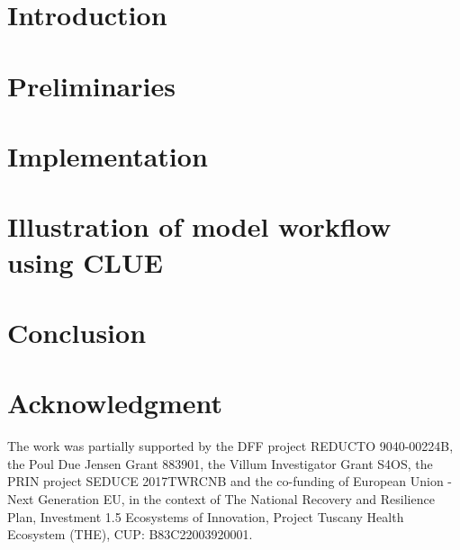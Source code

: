 \documentclass[a4paper,american]{llncs}
\begin{document}
\maketitle

\begin{abstract}
	
\end{abstract}



\section{Introduction}\label{sec_intro}




\section{Preliminaries}\label{sec_pre}




\section{Implementation}\label{sec_imp}





\section{Illustration of model workflow using CLUE}\label{sec_eval}





\section{Conclusion}\label{sec_conc}




\section*{Acknowledgment}
The work was partially supported by the DFF project REDUCTO 9040-00224B, the Poul Due Jensen Grant 883901, the Villum Investigator Grant S4OS, the PRIN project SEDUCE 2017TWRCNB and the co-funding of European Union - Next Generation EU, in the context of The National Recovery and Resilience Plan, Investment 1.5 Ecosystems of Innovation, Project Tuscany Health Ecosystem (THE), CUP: B83C22003920001.







\appendix
%

\end{document}
